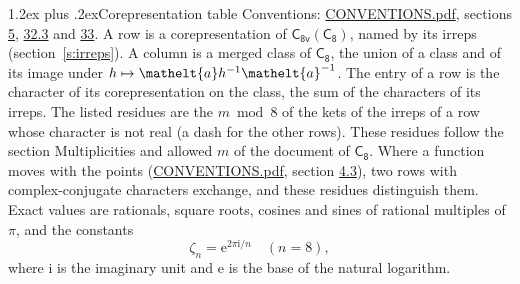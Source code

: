 \documentclass[10pt,a4paper]{article}
\makeatletter
\renewcommand\section{\@startsection{section}{1}{\z@}{-3ex plus -1ex minus -.2ex}%
  {1.2ex plus .2ex}{\normalfont\large\sffamily\bfseries\color{parttitle}}}
\numberwithin{equation}{section}
\newcommand{\eltfont}[1]{{\let\sigma\eltsigma\mathelt{#1}}}
\newcommand{\grp}[1]{\mathsf{#1}}
\newcommand{\elt}[1]{\eltfont{#1}}
\newcommand{\iunit}{\mathrm{i}}
\newcommand{\expe}{\mathrm{e}}
\newcommand{\rootunity}[1]{\zeta_{#1}}
\makeatother
\begin{document}
\section{Corepresentation table}\label{s:character_table}
Conventions: \href{../../CONVENTIONS.pdf}{CONVENTIONS.pdf}, sections \href{../../../rotation/CONVENTIONS.pdf\#conv.5}{5}, \href{../../CONVENTIONS.pdf\#conv.32.3}{32.3} and \href{../../CONVENTIONS.pdf\#conv.33}{33}.
A row is a corepresentation of $\grp{C_{8v}}(\grp{C_{8}})$, named by its irreps (section~\ref{s:irreps}). A column is a merged class of $\grp{C_{8}}$, the union of a class and of its image under $h \mapsto \elt{a} h^{-1} \elt{a}^{-1}$. The entry of a row is the character of its corepresentation on the class, the sum of the characters of its irreps.
\leavevmode\label{n:head.parity}The listed residues are the $m \bmod 8$ of the kets of the irreps of a row whose character is not real (a dash for the other rows). These residues follow the section Multiplicities and allowed $m$ of the document of \href{../../../rotation/data/pdf/C8.pdf}{$\grp{C_{8}}$}. Where a function moves with the points (\href{../../CONVENTIONS.pdf}{CONVENTIONS.pdf}, section \href{../../../rotation/CONVENTIONS.pdf\#conv.4.3}{4.3}), two rows with complex-conjugate characters exchange, and these residues distinguish them.
\leavevmode\label{n:constant.root}\label{n:index.root.order}Exact values are rationals, square roots, cosines and sines of rational multiples of $\pi$, and the constants
\begin{equation}\label{e:constants}\rootunity{n} = \expe^{2\pi\iunit/n}\quad(n = 8),\end{equation}
where $\iunit$ is the imaginary unit and $\expe$ is the base of the natural logarithm.
\end{document}

